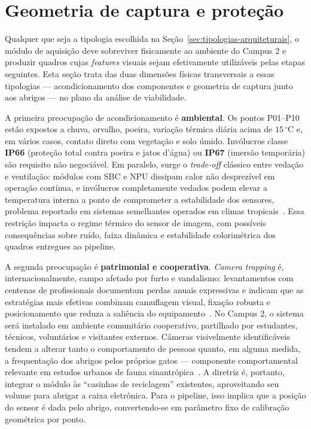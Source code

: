 \section{Geometria de captura e proteção}
\label{sec:acondicionamento-geometria}

Qualquer que seja a tipologia escolhida na Seção~\ref{sec:tipologias-arquiteturais}, o módulo de aquisição deve sobreviver fisicamente ao ambiente do Campus 2 e produzir quadros cujas \emph{features} visuais sejam efetivamente utilizáveis pelas etapas seguintes. Esta seção trata das duas dimensões físicas transversais a essas tipologias --- acondicionamento dos componentes e geometria de captura junto aos abrigos --- no plano da análise de viabilidade.

A primeira preocupação de acondicionamento é \textbf{ambiental}. Os pontos P01--P10 estão expostos a chuva, orvalho, poeira, variação térmica diária acima de \(15\,^\circ\mathrm{C}\) e, em vários casos, contato direto com vegetação e solo úmido. Invólucros classe \textbf{IP66} (proteção total contra poeira e jatos d'água) ou \textbf{IP67} (imersão temporária) são requisito não negociável. Em paralelo, surge o \emph{trade-off} clássico entre vedação e ventilação: módulos com SBC e NPU dissipam calor não desprezível em operação contínua, e invólucros completamente vedados podem elevar a temperatura interna a ponto de comprometer a estabilidade dos sensores, problema reportado em sistemas semelhantes operados em climas tropicais~\cite{tiddeman2023lowpowerhardware,sargent2021raspberrypi}. Essa restrição impacta o regime térmico do sensor de imagem, com possíveis consequências sobre ruído, faixa dinâmica e estabilidade colorimétrica dos quadros entregues ao pipeline.

A segunda preocupação é \textbf{patrimonial e cooperativa}. \emph{Camera trapping} é, internacionalmente, campo afetado por furto e vandalismo: levantamentos com centenas de profissionais documentam perdas anuais expressivas e indicam que as estratégias mais efetivas combinam camuflagem visual, fixação robusta e posicionamento que reduza a saliência do equipamento~\cite{meek2018theft}. No Campus 2, o sistema será instalado em ambiente comunitário cooperativo, partilhado por estudantes, técnicos, voluntários e visitantes externos. Câmeras visivelmente identificáveis tendem a alterar tanto o comportamento de pessoas quanto, em alguma medida, a frequentação dos abrigos pelos próprios gatos --- componente comportamental relevante em estudos urbanos de fauna sinantrópica~\cite{cove2022capital}. A diretriz é, portanto, integrar o módulo às ``casinhas de reciclagem'' existentes, aproveitando seu volume para abrigar a caixa eletrônica. Para o pipeline, isso implica que a posição do sensor é dada pelo abrigo, convertendo-se em parâmetro fixo de calibração geométrica por ponto.

